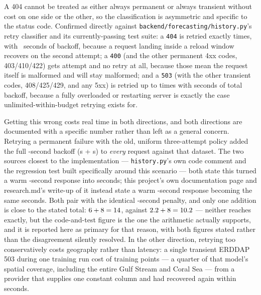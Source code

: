  A 404 cannot be treated as either always
permanent or always transient without cost on one side or the other, so the
classification is asymmetric and specific to the status code. Confirmed
directly against \texttt{backend/forecasting/history.py}'s retry
classifier and its currently-passing test suite: a \texttt{404} is retried
exactly \RetryAttemptsFourZeroFour{} times, with
\RetrySecondsFourZeroFour{}~seconds of backoff, because a request landing
inside a reload window recovers on the second attempt; a \texttt{400} (and
the other permanent 4xx codes, 403/410/422) gets \RetryAttemptsFourHundred{}
attempt and no retry at all, because those mean the request itself is
malformed and will stay malformed; and a \texttt{503} (with the other
transient codes, 408/425/429, and any 5xx) is retried up to
\RetryAttemptsFiveZeroThree{} times with \RetrySecondsFiveZeroThree{} seconds
of total backoff, because a fully overloaded or restarting server is exactly
the case unlimited-within-budget retrying exists for.

 Getting this wrong costs real time in both
directions, and both directions are documented with a specific number rather
than left as a general concern. Retrying a permanent failure with the old,
uniform three-attempt policy added the full \RetryPenaltySeconds{}-second
backoff (\RetryBackoffFirstSeconds{}s + \RetryBackoffSecondSeconds{}s) to
\emph{every} request against that dataset. The two sources closest to the
implementation --- \texttt{history.py}'s own code comment and the regression
test built specifically around this scenario --- both state this turned a
warm \WarmForecastCodeSeconds{}-second response into
\WarmForecastAfterBadRetrySeconds{} seconds; this project's own documentation
page and research.md's write-up of it instead state a warm
\WarmForecastDocsSeconds{}-second response becoming the same
\WarmForecastAfterBadRetrySeconds{} seconds. Both pair with the identical
\RetryPenaltySeconds{}-second penalty, and only one addition is close to the
stated total: \(6{} + 8{} = 14\),
against \(2.2{} + 8{} = 10.2\) ---
neither reaches \WarmForecastAfterBadRetrySeconds{} exactly, but the
code-and-test figure is the one the arithmetic actually supports, and it is
reported here as primary for that reason, with both figures stated rather
than the disagreement silently resolved. In the other direction, retrying
too conservatively costs geography rather than latency: a single transient
ERDDAP 503 during one training run cost \ErddapCostAffectedPoints{} of
\ErddapCostTotalPoints{} training points --- a quarter of that model's
spatial coverage, including the entire Gulf Stream and Coral Sea --- from a
provider that supplies one constant column and had recovered again within
seconds.

